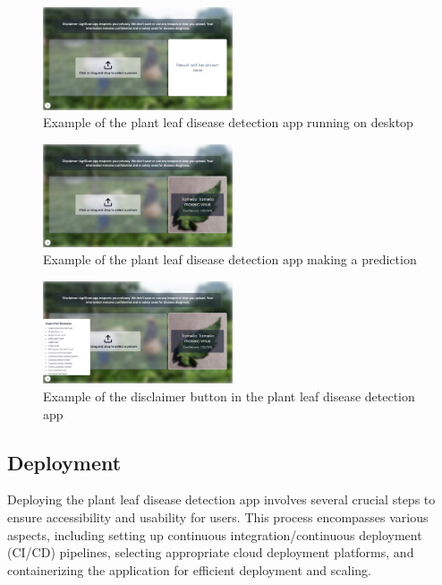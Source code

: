 \documentclass{article}
\begin{document}
\begin{figure}[h]
  \centering
  \includegraphics[width=0.5\textwidth]{pc-home.png}
  \caption{Example of the plant leaf disease detection app running on desktop}
  \label{fig:desktop_version}
\end{figure}

\begin{figure}[h]
  \centering
  \includegraphics[width=0.5\textwidth]{pc-predict.png}
  \caption{Example of the plant leaf disease detection app making a prediction}
  \label{fig:prediction_desktop}
\end{figure}

\begin{figure}[h]
  \centering
  \includegraphics[width=0.5\textwidth]{pc-i-button.png}
  \caption{Example of the disclaimer button in the plant leaf disease detection app}
  \label{fig:disclaimer_button}
\end{figure}


\subsection{Deployment}

Deploying the plant leaf disease detection app involves several crucial steps to ensure accessibility and usability for users. This process encompasses various aspects, including setting up continuous integration/continuous deployment (CI/CD) pipelines, selecting appropriate cloud deployment platforms, and containerizing the application for efficient deployment and scaling.
\end{document}

